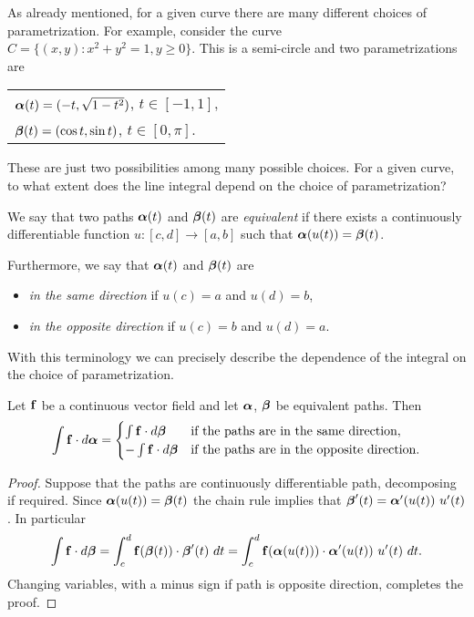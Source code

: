 As already mentioned, for a given curve there are many different choices of parametrization.
For example, consider the curve \(C = \{(x,y) : x^2 + y^2 = 1, y\geq 0\}\).
This is a semi-circle and two parametrizations are
\begin{center}
    \begin{tabular}{l}
        \(\boldsymbol{\alpha}(t) = (-t, \sqrt{1-t^2})\), \(t\in [-1,1]\), \\
        \(\boldsymbol{\beta}(t) = (\cos t, \sin t)\), \(t\in [0,\pi]\).
    \end{tabular}
\end{center}
These are just two possibilities among many possible choices.
For a given curve, to what extent does the line integral depend on the choice of parametrization?

\begin{definition}
    We say that two paths \(\boldsymbol{\alpha}(t)\) and \(\boldsymbol{\beta}(t)\) are \emph{equivalent} if there exists a continuously differentiable function \(u : [c,d] \to [a,b] \) such that \(\boldsymbol{\alpha}(u(t)) = \boldsymbol{\beta}(t)\).

    Furthermore, we say that \(\boldsymbol{\alpha}(t)\) and \(\boldsymbol{\beta}(t)\) are
    \begin{itemize}
        \item \emph{in the same direction} if \(u(c)=a\) and \(u(d)=b\),
        \item \emph{in the opposite direction} if \(u(c)=b\) and \(u(d)=a\).
    \end{itemize}
\end{definition}

With this terminology we can precisely describe the dependence of the integral on the choice of parametrization.

\begin{theorem}%
    \label{thm:change-param}
    Let \(\mathbf{f}\) be a continuous vector field and let \(\boldsymbol{\alpha}\), \(\boldsymbol{\beta}\) be equivalent paths.
    Then
    \[
        \int \mathbf{f} \cdot d\boldsymbol{\alpha} =
        \begin{cases}
            \int \mathbf{f} \cdot d\boldsymbol{\beta}   & \text{if the paths are in the same direction},     \\
            - \int \mathbf{f} \cdot d\boldsymbol{\beta} & \text{if the paths are in the opposite direction}.
        \end{cases}
    \]
\end{theorem}

\begin{proof}
    Suppose that the paths are continuously differentiable path, decomposing if required.
    Since \(\boldsymbol{\alpha}(u(t)) = \boldsymbol{\beta}(t)\) the chain rule implies that
    \( \bbeta'(t) = \aalpha'(u(t)) \ u'(t)\).
    In particular
    \[
        \displaystyle \int \mathbf{f} \cdot  d\boldsymbol{\beta} = \displaystyle \int_c^d \mathbf{f}(\boldsymbol{\beta}(t)) \cdot \boldsymbol{\beta}'(t) \ dt =  \displaystyle \int_c^d \mathbf{f}(\boldsymbol{\alpha}(u(t))) \cdot \boldsymbol{\alpha}'(u(t)) \ u'(t) \ dt.
    \]
    Changing variables, with a minus sign if path is opposite direction, completes the proof.
\end{proof}


